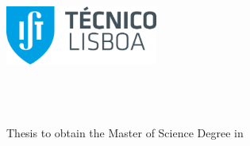 
\begin{titlepage}
\includegraphics[width=5cm]{images/ist_logo}~\\
%
\if{}
  \vspace*{\finalLogoSpacing}
\else
  \vspace*{\draftLogoSpacing}
\fi

\begin{center}
{\LARGE \textbf{\Title}}\\[1.0cm]
{\Large \Subtitle}\\[1.0cm]
{\Large \textbf{\StudentName}}\\[1.0cm]
{\large Thesis to obtain the Master of Science Degree in}\\[1.0cm]
{\LARGE \textbf{\DegreeName}}\\[1.0cm]


\end{center}
\end{titlepage}
